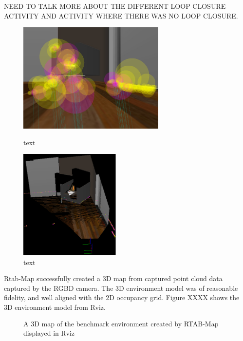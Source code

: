\documentclass[a4paper]{article}
\begin{document}
NEED TO TALK MORE ABOUT THE DIFFERENT LOOP CLOSURE ACTIVITY AND ACTIVITY WHERE THERE WAS NO LOOP CLOSURE.

\begin{figure}[h]
\centering
\begin{minipage}[t]{0.45\textwidth}
\centering
\includegraphics[height=5.5cm]{kitchen_features}
\caption{text}
\end{minipage}
\hspace{1cm}
\begin{minipage}[t]{0.45\textwidth}
\centering
\includegraphics[height=5.5cm]{kitchen_constraints}
\caption{text}
\end{minipage}
\end{figure}

Rtab-Map successfully created a 3D map from captured point cloud data captured by the RGBD camera. The 3D environment model was of reasonable fidelity, and well aligned with the 2D occupancy grid. Figure XXXX shows the 3D environment model from Rviz.
\begin{figure}[h]
\centering
{}
\caption{A 3D map of the benchmark environment created by RTAB-Map displayed in Rviz}
\end{figure}
\end{document}
